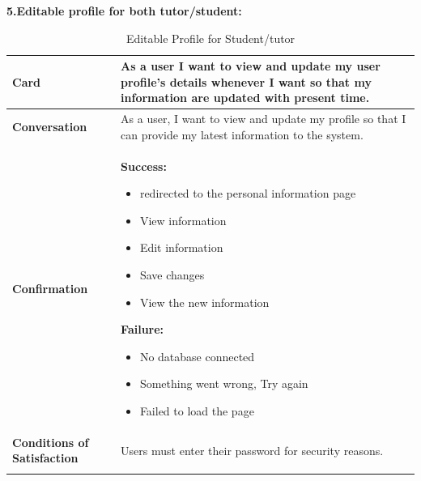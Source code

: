 \textbf{5.Editable profile for both tutor/student:}
\begin{center}
\setlength{\tabcolsep}{0.8cm}
\renewcommand{\arraystretch}{1.2}
        \centering
        \begin{longtable}{|m{70pt}|p{9cm}|}
            \hline
                \textbf{Card} &
                As a user I want to view and update my user profile's details whenever I want so that my information are updated with present time.\\
            \hline
                \textbf{Conversation} &
                    As a user, I want to view and update my profile so that I can provide my latest information to the system.\\
            \hline
                \textbf{Confirmation} &
                     \textbf{ Success:}
                        \begin{itemize}
                            \item redirected to the personal information page
                            \item View information
                            \item  Edit information
                            \item Save changes
                            \item  View the new information
                        \end{itemize}
                    \textbf{Failure:}
                        \begin{itemize}
                            \item No database connected
                            \item Something went wrong, Try again
                            \item Failed to load the page
                        \end{itemize}\\
            \hline
                \textbf{Conditions of Satisfaction} &  
                    Users must enter their password for security reasons.\\
            \hline
        \caption{Editable Profile for Student/tutor}
        \label{tab:my_label}
        \end{longtable}
\end{center}

